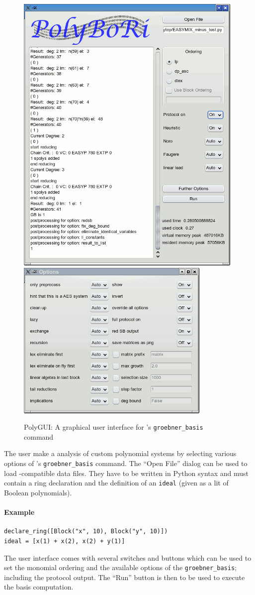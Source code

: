 \begin{figure}
\includegraphics[width=.4\textwidth]{PolyGui}~%
\includegraphics[width=.4\textwidth]{PolyGui-Options}
\caption{PolyGUI:  A graphical user interface for \PolyBoRi's
  \texttt{groebner_basis} command}
\end{figure}


The user make a \Groebner analysis of custom polynomial systems by selecting various options
of \PolyBoRi's \texttt{groebner_basis} command. The ``Open File'' dialog can be
used to load \PolyBoRi-compatible data files. They have to be written in
Python syntax and must contain a ring declaration and the definition of an
\texttt{ideal} (given as a lit of Boolean polynomials).

\paragraph{Example}
\begin{lstlisting}
declare_ring([Block("x", 10), Block("y", 10)])
ideal = [x(1) + x(2), x(2) + y(1)]
\end{lstlisting}

The user interface comes with several switches and buttons which can be used to set
the monomial ordering and the available options of the  \texttt{groebner_basis};
including the protocol  output.
The ``Run'' button is then to be used to execute the \Groebner basis computation.



